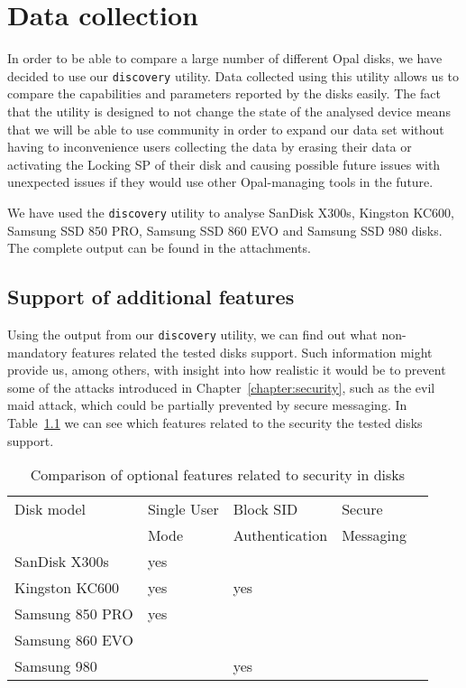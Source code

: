 \chapter{Data collection}
\label{chapter:data}

In order to be able to compare a large number of different Opal disks, we have decided to use our \verb|discovery| utility. 
Data collected using this utility allows us to compare the capabilities and parameters reported by the disks easily. 
The fact that the utility is designed to not change the state of the analysed device means that we will be able to use community in order to expand our data set without having to inconvenience users collecting the data by erasing their data or activating the Locking SP of their disk and causing possible future issues with unexpected issues if they would use other Opal-managing tools in the future.

We have used the \verb|discovery| utility to analyse SanDisk X300s, Kingston KC600, Samsung SSD 850 PRO, Samsung SSD 860 EVO and Samsung SSD 980 disks. The complete output can be found in the attachments.


\section{Support of additional features}

Using the output from our \verb|discovery| utility, we can find out what non-mandatory features related the tested disks support.
Such information might provide us, among others, with insight into how realistic it would be to prevent some of the attacks introduced in Chapter~\ref{chapter:security}, such as the evil maid attack, which could be partially prevented by secure messaging.
In Table~\ref{table:compare_feature_sets} we can see which features related to the security the tested disks support.

\begin{table}
\small
\begin{tabularx}{\textwidth}{lXXXX}
\toprule
Disk model      & Single User & Block SID        & Secure  \\ 
                & Mode        & Authentication   & Messaging \\ 
\midrule
SanDisk X300s   & yes              &                          &                   \\
Kingston KC600  & yes              & yes                      &                   \\
Samsung 850 PRO & yes              &                          &                   \\
Samsung 860 EVO &                  &                          &                   \\
Samsung 980     &                  & yes                      &                  \\ 
\bottomrule
\end{tabularx}
\caption{Comparison of optional features related to security in disks}
\label{table:compare_feature_sets}
\end{table}

